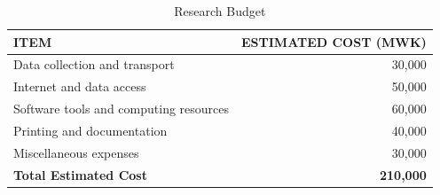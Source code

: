 \documentclass[12pt,a4paper]{article}
\begin{document}
\begin{table}[htbp]
    \centering
    \begin{tabular}{lr}
        \toprule
        \textbf{ITEM} & \textbf{ESTIMATED COST (MWK)} \\
        \midrule
        Data collection and transport & 30,000 \\
        Internet and data access & 50,000 \\
        Software tools and computing resources & 60,000 \\
        Printing and documentation & 40,000 \\
        Miscellaneous expenses & 30,000 \\
        \midrule
        \textbf{Total Estimated Cost} & \textbf{210,000} \\
        \bottomrule
    \end{tabular}
    \caption{Research Budget}
\end{table}

\newpage


\end{document}
